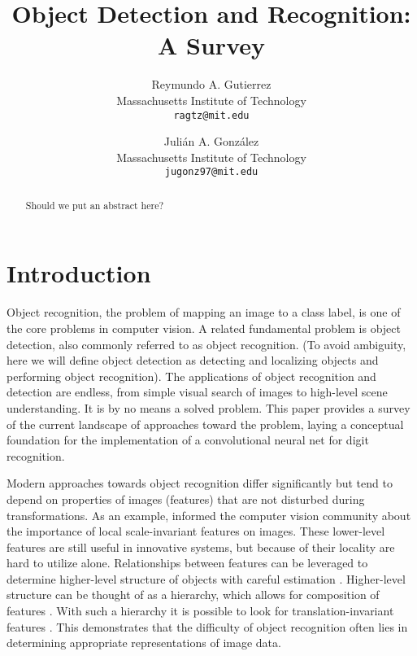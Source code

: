 \documentclass[10pt,twocolumn,letterpaper]{article}
\begin{document}
\title{Object Detection and Recognition: A Survey}

\author{Reymundo A. Gutierrez\\
Massachusetts Institute of Technology\\
{\tt\small ragtz@mit.edu}\\
\and
Juli\'{a}n A. Gonz\'{a}lez\\
Massachusetts Institute of Technology\\
{\tt\small jugonz97@mit.edu}
}

\maketitle

\begin{abstract}
   Should we put an abstract here?
\end{abstract}

\section{Introduction}

Object recognition, the problem of mapping an image to a class label, is one of the core
problems in computer vision.
A related fundamental problem is object detection, also commonly referred to as object recognition.
(To avoid ambiguity, here we will define object detection as detecting and localizing objects and
performing object recognition).
The applications of object recognition and detection are endless, from simple visual search of
images to high-level scene understanding. It is by no means a solved problem.
This paper provides a survey of the current landscape of approaches toward the problem,
laying a conceptual foundation for the implementation of a convolutional neural net for
digit recognition.

Modern approaches towards object recognition differ significantly but tend to depend on
properties of images (features) that are not disturbed during transformations.
As an example, \cite{LoweObjSIFT} informed the computer vision community about the importance of local
scale-invariant features on images.
These lower-level features are still useful in innovative systems, but because of their
locality are hard to utilize alone.
Relationships between features can be leveraged to determine higher-level structure of
objects with careful estimation \cite{PartModels}.
Higher-level structure can be thought of as a hierarchy, which allows for composition of features \cite{HintonDBN}.
With such a hierarchy it is possible to look for translation-invariant features \cite{CDBN}.
This demonstrates that the difficulty of object recognition often lies in determining
appropriate representations of image data.
\end{document}
